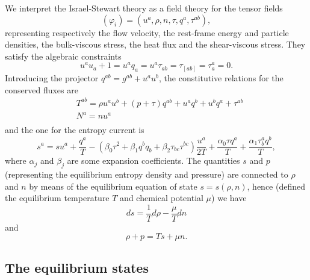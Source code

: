 \documentclass[a4paper, amsfonts, amssymb, amsmath, reprint, showkeys, nofootinbib, twoside, onecolumn,notitlepage]{revtex4-1}
\begin{document}
We interpret the Israel-Stewart theory as a field theory for the tensor fields
\begin{equation}\label{IsraelFields}
(\varphi_i) = (u^a,\rho,n,\tau,q^a,\tau^{ab}),
\end{equation}
representing respectively the flow velocity, the rest-frame energy and particle densities, the bulk-viscous stress, the heat flux and the shear-viscous stress. They satisfy the algebraic constraints
\begin{equation}\label{algebrain}
u^a u_a+1 = u^a q_a = u^a \tau_{ab}=\tau_{[ab]}=\tau^a_a =0.
\end{equation}
Introducing the projector $q^{ab}=g^{ab} +u^a u^b$, the constitutive relations for the conserved fluxes are
\begin{equation}\label{ISstress}
\begin{split}
& T^{ab} = \rho u^a u^b +(p+\tau)q^{ab} + u^a q^b + u^b q^a + \tau^{ab}  \\
& N^a = nu^a \\
\end{split}
\end{equation}
and the one for the entropy current is
\begin{equation}\label{constituentropy}
s^a = su^a + \dfrac{q^a}{T} - (\beta_0 \tau^2+\beta_1 q^b q_b +\beta_2 \tau_{bc}\tau^{bc}) \dfrac{u^a}{2T} + \dfrac{\alpha_0 \tau q^a}{T} +\dfrac{\alpha_1 \tau^a_b q^b}{T},
\end{equation}
where $\alpha_j$ and $\beta_j$ are some expansion coefficients.
The quantities $s$ and $p$ (representing the equilibrium entropy density and pressure) are connected to $\rho$ and $n$ by means of the equilibrium equation of state $s=s(\rho,n)$, hence (defined the equilibrium temperature $T$ and chemical potential $\mu$) we have
\begin{equation}\label{entropon}
ds = \dfrac{1}{T} d\rho - \dfrac{\mu}{T} dn
\end{equation}
and
\begin{equation}\label{Euler}
\rho +p = Ts+\mu n.
\end{equation}


\subsection{The equilibrium states}
\end{document}
